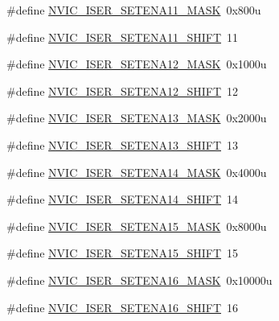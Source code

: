 \begin{DoxyCompactItemize}
\item 
\#define \hyperlink{group___n_v_i_c___register___masks_gae9d9774083a136d09c7ab2f9e7286745}{N\+V\+I\+C\+\_\+\+I\+S\+E\+R\+\_\+\+S\+E\+T\+E\+N\+A11\+\_\+\+M\+A\+SK}~0x800u
\item 
\#define \hyperlink{group___n_v_i_c___register___masks_ga753c81aa51bc8bf58183fdfc80aaffc1}{N\+V\+I\+C\+\_\+\+I\+S\+E\+R\+\_\+\+S\+E\+T\+E\+N\+A11\+\_\+\+S\+H\+I\+FT}~11
\item 
\#define \hyperlink{group___n_v_i_c___register___masks_ga16fd27360ca88d89cc020473705f9ec1}{N\+V\+I\+C\+\_\+\+I\+S\+E\+R\+\_\+\+S\+E\+T\+E\+N\+A12\+\_\+\+M\+A\+SK}~0x1000u
\item 
\#define \hyperlink{group___n_v_i_c___register___masks_ga213045aecec6b1ed43907a4b82299437}{N\+V\+I\+C\+\_\+\+I\+S\+E\+R\+\_\+\+S\+E\+T\+E\+N\+A12\+\_\+\+S\+H\+I\+FT}~12
\item 
\#define \hyperlink{group___n_v_i_c___register___masks_gaeb161f8e6f83117af452b4113a37c8f4}{N\+V\+I\+C\+\_\+\+I\+S\+E\+R\+\_\+\+S\+E\+T\+E\+N\+A13\+\_\+\+M\+A\+SK}~0x2000u
\item 
\#define \hyperlink{group___n_v_i_c___register___masks_gabef7fa9ab8ffc006387cc848684579cd}{N\+V\+I\+C\+\_\+\+I\+S\+E\+R\+\_\+\+S\+E\+T\+E\+N\+A13\+\_\+\+S\+H\+I\+FT}~13
\item 
\#define \hyperlink{group___n_v_i_c___register___masks_ga1339be31af808e4da80caa21f8842c84}{N\+V\+I\+C\+\_\+\+I\+S\+E\+R\+\_\+\+S\+E\+T\+E\+N\+A14\+\_\+\+M\+A\+SK}~0x4000u
\item 
\#define \hyperlink{group___n_v_i_c___register___masks_ga69fbbf57e6d9797c235ee1c79486ef68}{N\+V\+I\+C\+\_\+\+I\+S\+E\+R\+\_\+\+S\+E\+T\+E\+N\+A14\+\_\+\+S\+H\+I\+FT}~14
\item 
\#define \hyperlink{group___n_v_i_c___register___masks_ga1737ddd810d67e25757814b2856458b5}{N\+V\+I\+C\+\_\+\+I\+S\+E\+R\+\_\+\+S\+E\+T\+E\+N\+A15\+\_\+\+M\+A\+SK}~0x8000u
\item 
\#define \hyperlink{group___n_v_i_c___register___masks_gab583ce8e80daddfd5d24d92644536598}{N\+V\+I\+C\+\_\+\+I\+S\+E\+R\+\_\+\+S\+E\+T\+E\+N\+A15\+\_\+\+S\+H\+I\+FT}~15
\item 
\#define \hyperlink{group___n_v_i_c___register___masks_ga0486d40efafc2c6adac9fdd3aa53ff6c}{N\+V\+I\+C\+\_\+\+I\+S\+E\+R\+\_\+\+S\+E\+T\+E\+N\+A16\+\_\+\+M\+A\+SK}~0x10000u
\item 
\#define \hyperlink{group___n_v_i_c___register___masks_ga5265a57792df37e42aea8434a0e725b2}{N\+V\+I\+C\+\_\+\+I\+S\+E\+R\+\_\+\+S\+E\+T\+E\+N\+A16\+\_\+\+S\+H\+I\+FT}~16

\end{DoxyCompactItemize}

